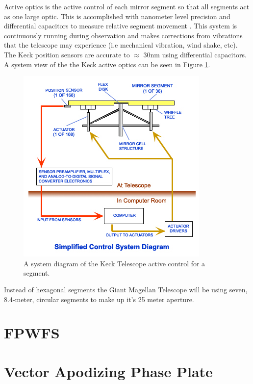 Active optics is the active control of each mirror segment so that all segments act as one large optic.  This is accomplished with nanometer level precision and differential capacitors to measure relative segment movement \cite{Nelson1990titleConstructionObservatory/title}.  This system is continuously running during observation and makes corrections from vibrations that the telescope may experience (i.e mechanical vibration, wind shake, etc).  The Keck position sensors are accurate to $\approx$ 30nm using differential capacitors.  A system view of the the Keck active optics can be seen in Figure \ref{fig:active_control}.


\begin{figure}[H]
\centering
\includegraphics[width=12 cm]{../Figures/KCompDiag}
\caption{A system diagram of the Keck Telescope active control for a segment.}
\label{fig:active_control}
\end{figure}

Instead of hexagonal segments the Giant Magellan Telescope will be using seven, 8.4-meter, circular segments to make up it's 25 meter aperture.  





\section{FPWFS}



\section{Vector Apodizing Phase Plate}







